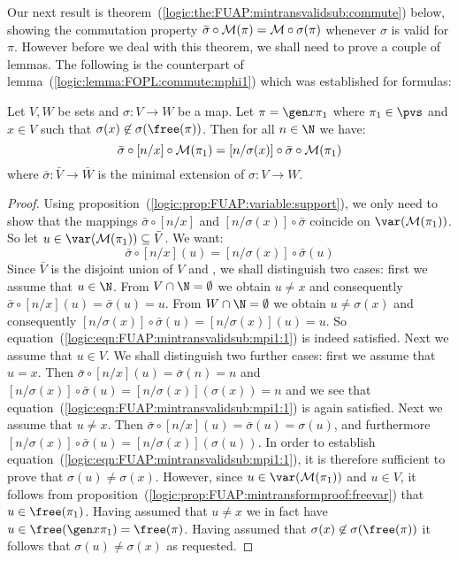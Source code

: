 Our next result is
theorem~(\ref{logic:the:FUAP:mintransvalidsub:commute}) below,
showing the commutation property $\bar{\sigma}\circ{\cal
M}(\pi)={\cal M}\circ\sigma(\pi)$ whenever $\sigma$ is valid for
$\pi$. However before we deal with this theorem, we shall need to
prove a couple of lemmas. The following is the counterpart of
lemma~(\ref{logic:lemma:FOPL:commute:mphi1}) which was established
for formulas:

\begin{lemma}\label{logic:lemma:FUAP:mintransvalidsub:mpi1}
Let $V,W$ be sets and $\sigma:V\to W$ be a map. Let $\pi=\gen
x\pi_{1}$ where $\pi_{1}\in\pvs$ and $x\in V$ such that
$\sigma(x)\not\in\sigma(\free(\pi))$. Then for all $n\in\N$ we have:
    \[
        \bar{\sigma}\circ [n/x]\circ{\cal
    M}(\pi_{1})= [n/\sigma(x)]\circ\bar{\sigma}\circ{\cal M}(\pi_{1})
    \]
where $\bar{\sigma}:\bar{V}\to\bar{W}$ is the minimal extension of
$\sigma: V\to W$.
\end{lemma}
\begin{proof}
Using proposition~(\ref{logic:prop:FUAP:variable:support}), we only
need to show that the mappings $\bar{\sigma}\circ [n/x]$ and
$[n/\sigma(x)]\circ\bar{\sigma}$ coincide on $\var({\cal
M}(\pi_{1}))$. So let $u\in\var({\cal M}(\pi_{1}))\subseteq\bar{V}$.
We want:
    \begin{equation}\label{logic:eqn:FUAP:mintransvalidsub:mpi1:1}
    \bar{\sigma}\circ [n/x](u)=[n/\sigma(x)]\circ\bar{\sigma}(u)
    \end{equation}
Since $\bar{V}$ is the disjoint union of $V$ and \N, we shall
distinguish two cases: first we assume that $u\in\N$. From
$V\cap\N=\emptyset$ we obtain $u\neq x$ and consequently
$\bar{\sigma}\circ[n/x](u)=\bar{\sigma}(u)=u$. From
$W\cap\N=\emptyset$ we obtain $u\neq\sigma(x)$ and consequently
$[n/\sigma(x)]\circ\bar{\sigma}(u)=[n/\sigma(x)](u)=u$. So
equation~(\ref{logic:eqn:FUAP:mintransvalidsub:mpi1:1}) is indeed
satisfied. Next we assume that $u\in V$. We shall distinguish two
further cases: first we assume that $u=x$. Then
$\bar{\sigma}\circ[n/x](u)=\bar{\sigma}(n)=n$ and
$[n/\sigma(x)]\circ\bar{\sigma}(u)=[n/\sigma(x)](\sigma(x))=n$ and
we see that equation~(\ref{logic:eqn:FUAP:mintransvalidsub:mpi1:1})
is again satisfied. Next we assume that $u\neq x$. Then
$\bar{\sigma}\circ[n/x](u)=\bar{\sigma}(u)=\sigma(u)$, and
furthermore
$[n/\sigma(x)]\circ\bar{\sigma}(u)=[n/\sigma(x)](\sigma(u))$. In
order to establish
equation~(\ref{logic:eqn:FUAP:mintransvalidsub:mpi1:1}), it is
therefore sufficient to prove that $\sigma(u)\neq\sigma(x)$.
However, since $u\in\var({\cal M}(\pi_{1}))$ and $u\in V$, it
follows from
proposition~(\ref{logic:prop:FUAP:mintransformproof:freevar}) that
$u\in\free(\pi_{1})$. Having assumed that $u\neq x$ we in fact have
$u\in\free(\gen x\pi_{1})=\free(\pi)$. Having assumed that
$\sigma(x)\not\in\sigma(\free(\pi))$ it follows that
$\sigma(u)\neq\sigma(x)$ as requested.
\end{proof}

